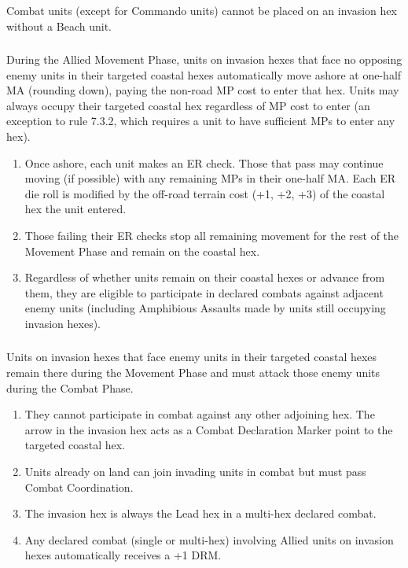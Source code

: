 \subsubsection{} Combat units (except for Commando units) cannot be placed on an invasion hex without a Beach unit.

\subsubsection{} During the Allied Movement Phase, units on invasion hexes that face no opposing enemy units in their targeted coastal hexes automatically move ashore at one-half MA (rounding down), paying the non-road MP cost to enter that hex. Units may always occupy their targeted coastal hex regardless of MP cost to enter (an exception to rule 7.3.2, which requires a unit to have sufficient MPs to enter any hex).

\begin{enumerate}[label=\alph*.]
    \item Once ashore, each unit makes an ER check. Those that pass may continue moving (if possible) with any remaining MPs in their one-half MA. Each ER die roll is modified by the off-road terrain cost (+1, +2, +3) of the coastal hex the unit entered.
    \item Those failing their ER checks stop all remaining movement for the rest of the Movement Phase and remain on the coastal hex.
    \item Regardless of whether units remain on their coastal hexes or advance from them, they are eligible to participate in declared combats against adjacent enemy units (including Amphibious Assaults made by units still occupying invasion hexes).
\end{enumerate}

\subsubsection{} Units on invasion hexes that face enemy units in their targeted coastal hexes remain there during the Movement Phase and must attack those enemy units during the Combat Phase.

\begin{enumerate}[label=\alph*.]
    \item They cannot participate in combat against any other adjoining hex. The arrow in the invasion hex acts as a Combat Declaration Marker point to the targeted coastal hex.
    \item Units already on land can join invading units in combat but must pass Combat Coordination.
    \item The invasion hex is always the Lead hex in a multi-hex declared combat.
    \item Any declared combat (single or multi-hex) involving Allied units on invasion hexes automatically receives a +1 DRM.
\end{enumerate}

